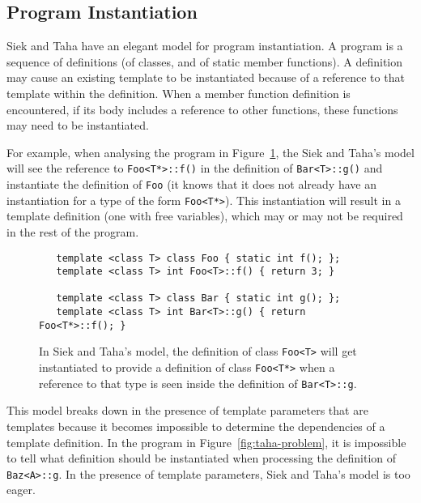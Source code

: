 \documentclass[11pt]{article}
\begin{document}
\subsection{Program Instantiation}

Siek and Taha have an elegant model for program instantiation.  A
program is a sequence of definitions (of classes, and of static member
functions).  A definition may cause an existing template to be
instantiated because of a reference to that template within the
definition.  When a member function definition is encountered, if its
body includes a reference to other functions, these functions may need
to be instantiated.

For example, when analysing the program in Figure~\ref{fig:taha-prog},
the Siek and Taha's model will see the reference to
\texttt{Foo<T*>::f()} in the definition of \texttt{Bar<T>::g()} and
instantiate the definition of \texttt{Foo} (it knows that it does not
already have an instantiation for a type of the form \texttt{Foo<T*>}).
This instantiation will result in a template definition (one with free
variables), which may or may not be required in the rest of the
program.
\begin{figure}
\begin{verbatim}
   template <class T> class Foo { static int f(); };
   template <class T> int Foo<T>::f() { return 3; }

   template <class T> class Bar { static int g(); };
   template <class T> int Bar<T>::g() { return Foo<T*>::f(); }
\end{verbatim}
  \caption{In Siek and Taha's model, the definition of
    class \texttt{Foo<T>} will get instantiated to provide a definition
    of class \texttt{Foo<T*>} when a reference to that type is seen
    inside the definition of \texttt{Bar<T>::g}.}
\label{fig:taha-prog}
\end{figure}

This model breaks down in the presence of template parameters that are
templates because it becomes impossible to determine the dependencies
of a template definition.  In the program in
Figure~\ref{fig:taha-problem}, it is impossible to tell what
definition should be instantiated when processing the definition of
\texttt{Baz<A>::g}.  In the presence of template parameters, Siek and
Taha's model is too eager.
\end{document}
